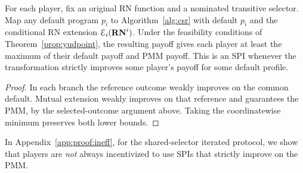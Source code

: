 \documentclass[sigconf]{aamas}
\theoremstyle{definition}
\begin{document}
\begin{proposition}\label{prop:itspi}
For each player, fix an original RN function and a nominated transitive
selector. Map any default program $p_i$ to Algorithm~\ref{alg:csr} with
default $p_i$ and the conditional RN extension $\mathcal E_i(\mathbf{RN}^{i})$.
Under the feasibility conditions of Theorem~\ref{prop:yudpoint}, the
resulting payoff gives each player at least the maximum of their default
payoff and PMM payoff. This is an SPI whenever the transformation
strictly improves some player's payoff for some default profile.
\end{proposition}
\begin{proof}
In each branch the reference outcome weakly improves on the common
default. Mutual extension weakly improves on that reference and
guarantees the PMM, by the selected-outcome argument above.
Taking the coordinatewise minimum preserves both lower bounds.
\end{proof}

In
Appendix~\ref{app:proof:ineff},
for the shared-selector iterated protocol, we show that
players are \textit{not}
always incentivized
to use SPIs
that strictly
improve on the PMM. 
\end{document}
